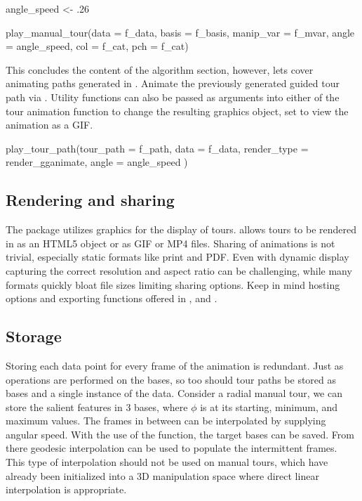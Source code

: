 \begin{Schunk}
\begin{Sinput}
angle_speed <- .26

play_manual_tour(data = f_data,
                 basis = f_basis, 
                 manip_var = f_mvar, 
                 angle = angle_speed,
                 col = f_cat,
                 pch = f_cat)
\end{Sinput}
\end{Schunk}

This concludes the content of the algorithm section, however, lets cover
animating paths generated in . Animate the previously
generated guided tour path via . Utility
functions can also be passed as arguments into either of the tour
animation function to change the resulting graphics object, set
 to view the animation as a GIF.

\begin{Schunk}
\begin{Sinput}
play_tour_path(tour_path = f_path,
               data = f_data,
               render_type = render_gganimate, 
               angle = angle_speed
)
\end{Sinput}
\end{Schunk}

\hypertarget{rendering-and-sharing}{%
\subsection{Rendering and sharing}\label{rendering-and-sharing}}

The  package utilizes  graphics for the display of
tours.  allows tours to be rendered in  as an
HTML5 object or  as GIF or MP4 files. Sharing of
animations is not trivial, especially static formats like print and PDF.
Even with dynamic display capturing the correct resolution and aspect
ratio can be challenging, while many formats quickly bloat file sizes
limiting sharing options. Keep in mind hosting options and exporting
functions offered in ,  and .

\hypertarget{storage}{%
\subsection{Storage}\label{storage}}

Storing each data point for every frame of the animation is redundant.
Just as operations are performed on the bases, so too should tour paths
be stored as bases and a single instance of the data. Consider a radial
manual tour, we can store the salient features in 3 bases, where
\(\phi\) is at its starting, minimum, and maximum values. The frames in
between can be interpolated by supplying angular speed. With the use of
the  function, the target bases can be
saved. From there geodesic interpolation can be used to populate the
intermittent frames. This type of interpolation should not be used on
manual tours, which have already been initialized into a 3D manipulation
space where direct linear interpolation is appropriate.

